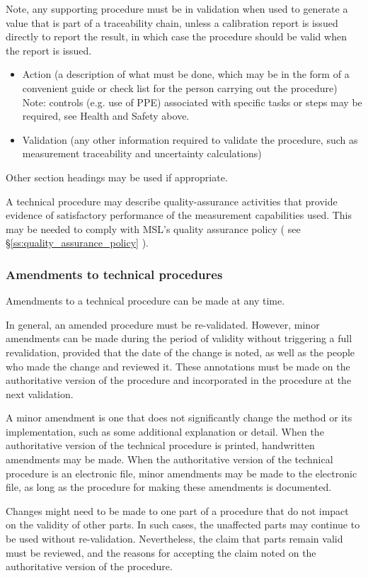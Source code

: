 Note, any supporting procedure must be in validation when used to generate a value that is part of a traceability chain, unless a calibration report is issued directly to report the result, in which case the procedure should be valid when the report is issued. 

\begin{itemize}
\item Action (a description of what must be done, which may be in the form of a convenient guide or check list for the person carrying out the procedure) Note: controls (e.g. use of PPE) associated with specific tasks or steps may be required, see Health and Safety above.
\item Validation (any other information required to validate the procedure, such as measurement traceability and uncertainty calculations)
\end{itemize}

Other section headings may be used if appropriate.

A technical procedure may describe quality-assurance activities that provide evidence of satisfactory performance of the measurement capabilities used.  This may be needed to comply with MSL's quality assurance policy ( see \S\ref{ss:quality_assurance_policy} ).

\subsubsection{Amendments to technical procedures}
Amendments to a technical procedure can be made at any time. 

In general, an amended procedure must be re-validated. However, minor amendments can be made during the period of validity without triggering a full revalidation, provided that the date of the change is noted, as well as the people who made the change and reviewed it. These annotations must be made on the authoritative version of the procedure and incorporated in the procedure at the next validation.

A minor amendment is one that does not significantly change the method or its implementation, such as some additional explanation or detail.  When the authoritative version of the technical procedure is printed, handwritten amendments may be made.  When the authoritative version of the technical procedure is an electronic file, minor amendments may be made to the electronic file, as long as the procedure for making these amendments is documented.

Changes might need to be made to one part of a procedure that do not impact on the validity of other parts. In such cases, the unaffected parts may continue to be used without re-validation. Nevertheless, the claim that parts remain valid must be reviewed, and the reasons for accepting the claim noted on the authoritative version of the procedure.

